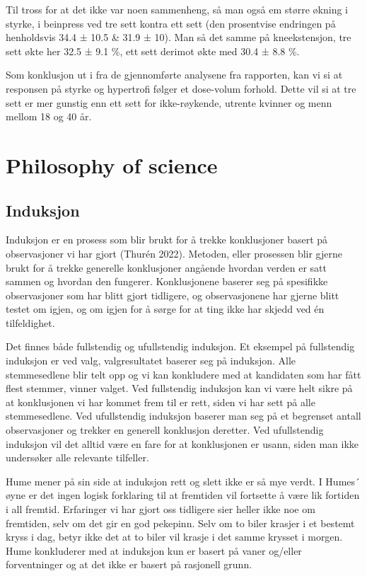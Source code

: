\documentclass[
  letterpaper,
  DIV=11,
  numbers=noendperiod]{scrreprt}
\begin{document}
Til tross for at det ikke var noen sammenheng, så man også em større
økning i styrke, i beinpress ved tre sett kontra ett sett (den
prosentvise endringen på henholdsvis 34.4 ± 10.5 \& 31.9 ± 10). Man så
det samme på kneekstensjon, tre sett økte her 32.5 ± 9.1 \%, ett sett
derimot økte med 30.4 ± 8.8 \%.

Som konklusjon ut i fra de gjennomførte analysene fra rapporten, kan vi
si at responsen på styrke og hypertrofi følger et dose-volum forhold.
Dette vil si at tre sett er mer gunstig enn ett sett for ikke-røykende,
utrente kvinner og menn mellom 18 og 40 år.


\chapter{Philosophy of science}\label{philosophy-of-science}

\section{Induksjon}\label{induksjon}

Induksjon er en prosess som blir brukt for å trekke konklusjoner basert
på observasjoner vi har gjort (Thurén 2022). Metoden, eller prosessen
blir gjerne brukt for å trekke generelle konklusjoner angående hvordan
verden er satt sammen og hvordan den fungerer. Konklusjonene baserer seg
på spesifikke observasjoner som har blitt gjort tidligere, og
observasjonene har gjerne blitt testet om igjen, og om igjen for å sørge
for at ting ikke har skjedd ved én tilfeldighet.

Det finnes både fullstendig og ufullstendig induksjon. Et eksempel på
fullstendig induksjon er ved valg, valgresultatet baserer seg på
induksjon. Alle stemmesedlene blir telt opp og vi kan konkludere med at
kandidaten som har fått flest stemmer, vinner valget. Ved fullstendig
induksjon kan vi være helt sikre på at konklusjonen vi har kommet frem
til er rett, siden vi har sett på alle stemmesedlene. Ved ufullstendig
induksjon baserer man seg på et begrenset antall observasjoner og
trekker en generell konklusjon deretter. Ved ufullstendig induksjon vil
det alltid være en fare for at konklusjonen er usann, siden man ikke
undersøker alle relevante tilfeller.

Hume mener på sin side at induksjon rett og slett ikke er så mye verdt.
I Humes´ øyne er det ingen logisk forklaring til at fremtiden vil
fortsette å være lik fortiden i all fremtid. Erfaringer vi har gjort oss
tidligere sier heller ikke noe om fremtiden, selv om det gir en god
pekepinn. Selv om to biler krasjer i et bestemt kryss i dag, betyr ikke
det at to biler vil krasje i det samme krysset i morgen. Hume
konkluderer med at induksjon kun er basert på vaner og/eller
forventninger og at det ikke er basert på rasjonell grunn.
\end{document}
